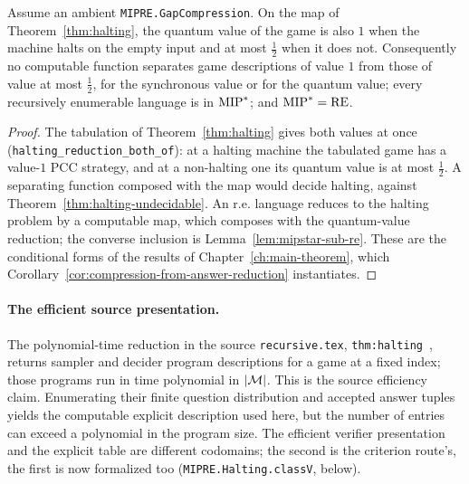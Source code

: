 \begin{corollary}
\label{cor:halting-consequences}
\leanok
Assume an ambient \texttt{MIPRE.GapCompression}. On the map of Theorem~\ref{thm:halting}, the
quantum value of the game is also $1$ when the machine halts on the empty input and at most
$\tfrac12$ when it does not. Consequently no computable function separates game
descriptions of value $1$ from those of value at most $\tfrac12$, for the synchronous value
or for the quantum value; every recursively enumerable language is in $\mathrm{MIP}^*$; and
$\mathrm{MIP}^* = \mathrm{RE}$.
\end{corollary}

\begin{proof}
\leanok
The tabulation of Theorem~\ref{thm:halting} gives both values at once
(\texttt{halting\_reduction\_both\_of}): at a halting machine the tabulated game has a value-$1$
PCC strategy, and at a non-halting one its quantum value is at most $\tfrac12$. A separating function composed with
the map would decide halting, against Theorem~\ref{thm:halting-undecidable}. An r.e. language
reduces to the halting problem by a computable map, which composes with the quantum-value
reduction; the converse inclusion is Lemma~\ref{lem:mipstar-sub-re}.
These are the conditional forms of the results of Chapter~\ref{ch:main-theorem}, which
Corollary~\ref{cor:compression-from-answer-reduction} instantiates.
\end{proof}

\paragraph{The efficient source presentation.}
The polynomial-time reduction in the source \texttt{recursive.tex},
\texttt{thm:halting}~\cite{AuditSync26}, returns sampler and decider program
descriptions for a game at a fixed index; those programs run in time polynomial in
$\left\vert {\mathcal{M}} \right\vert$. This is the source efficiency claim. Enumerating their finite
question distribution and accepted answer tuples yields the computable explicit
description used here, but the number of entries can exceed a polynomial in the
program size. The efficient verifier presentation and the explicit table are
different codomains; the second is the criterion route's, the first is now formalized too
(\texttt{MIPRE.Halting.classV}, below).

